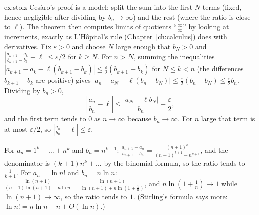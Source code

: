 \begin{solution}{ex:stolz}
\idea Ces\`aro's proof is a model: split the sum into the first $N$ terms (fixed, hence negligible after dividing by $b_n\to\infty$) and the rest (where the ratio is close to $\ell$). The theorem then computes limits of quotients ``$\frac\infty\infty$'' by looking at increments, exactly as L'H\^opital's rule (Chapter~\ref{ch:calculus}) does with derivatives.
\writeup Fix $\varepsilon>0$ and choose $N$ large enough that $b_N>0$ and $\left|\frac{a_{k+1}-a_k}{b_{k+1}-b_k}-\ell\right|\le\varepsilon/2$ for $k\ge N$. For $n>N$, summing the inequalities $|a_{k+1}-a_k-\ell(b_{k+1}-b_k)|\le\frac\varepsilon2(b_{k+1}-b_k)$ for $N\le k<n$ (the differences $b_{k+1}-b_k$ are positive) gives
$|a_n-a_N-\ell(b_n-b_N)|\le\frac\varepsilon2(b_n-b_N)\le\frac\varepsilon2 b_n$. Dividing by $b_n>0$,
\[
\left|\frac{a_n}{b_n}-\ell\right|\le\frac{|a_N-\ell b_N|}{b_n}+\frac\varepsilon2,
\]
and the first term tends to $0$ as $n\to\infty$ because $b_n\to\infty$. For $n$ large that term is at most $\varepsilon/2$, so $\left|\frac{a_n}{b_n}-\ell\right|\le\varepsilon$.

For $a_n=1^k+\dots+n^k$ and $b_n=n^{k+1}$: $\frac{a_{n+1}-a_n}{b_{n+1}-b_n}=\frac{(n+1)^k}{(n+1)^{k+1}-n^{k+1}}$, and the denominator is $(k+1)n^k+\dots$ by the binomial formula, so the ratio tends to $\frac1{k+1}$.
For $a_n=\ln n!$ and $b_n=n\ln n$: $\frac{\ln(n+1)}{(n+1)\ln(n+1)-n\ln n}=\frac{\ln(n+1)}{\ln(n+1)+n\ln(1+\frac1n)}$, and $n\ln(1+\frac1n)\to1$ while $\ln(n+1)\to\infty$, so the ratio tends to $1$. (Stirling's formula says more: $\ln n!=n\ln n-n+O(\ln n)$.)
\end{solution}

